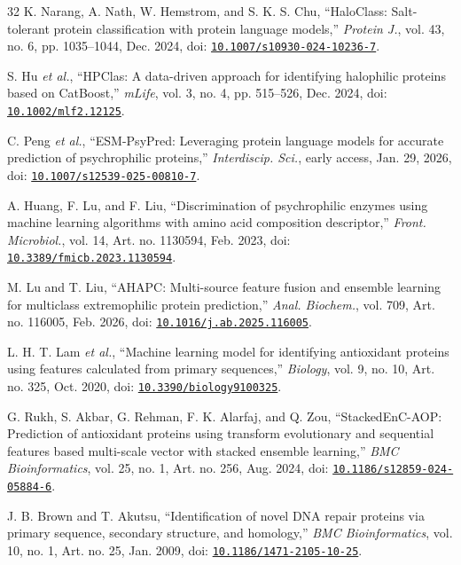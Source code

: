 \documentclass[conference]{IEEEtran}
\begin{document}
\begin{thebibliography}{32}
 K. Narang, A. Nath, W. Hemstrom, and S. K. S. Chu, ``HaloClass: Salt-tolerant protein classification with protein language models,'' \textit{Protein J.}, vol. 43, no. 6, pp. 1035--1044, Dec. 2024, doi: \href{https://doi.org/10.1007/s10930-024-10236-7}{\nolinkurl{10.1007/s10930-024-10236-7}}.

 S. Hu \textit{et al.}, ``HPClas: A data-driven approach for identifying halophilic proteins based on CatBoost,'' \textit{mLife}, vol. 3, no. 4, pp. 515--526, Dec. 2024, doi: \href{https://doi.org/10.1002/mlf2.12125}{\nolinkurl{10.1002/mlf2.12125}}.

 C. Peng \textit{et al.}, ``ESM-PsyPred: Leveraging protein language models for accurate prediction of psychrophilic proteins,'' \textit{Interdiscip. Sci.}, early access, Jan. 29, 2026, doi: \href{https://doi.org/10.1007/s12539-025-00810-7}{\nolinkurl{10.1007/s12539-025-00810-7}}.

 A. Huang, F. Lu, and F. Liu, ``Discrimination of psychrophilic enzymes using machine learning algorithms with amino acid composition descriptor,'' \textit{Front. Microbiol.}, vol. 14, Art. no. 1130594, Feb. 2023, doi: \href{https://doi.org/10.3389/fmicb.2023.1130594}{\nolinkurl{10.3389/fmicb.2023.1130594}}.

 M. Lu and T. Liu, ``AHAPC: Multi-source feature fusion and ensemble learning for multiclass extremophilic protein prediction,'' \textit{Anal. Biochem.}, vol. 709, Art. no. 116005, Feb. 2026, doi: \href{https://doi.org/10.1016/j.ab.2025.116005}{\nolinkurl{10.1016/j.ab.2025.116005}}.

 L. H. T. Lam \textit{et al.}, ``Machine learning model for identifying antioxidant proteins using features calculated from primary sequences,'' \textit{Biology}, vol. 9, no. 10, Art. no. 325, Oct. 2020, doi: \href{https://doi.org/10.3390/biology9100325}{\nolinkurl{10.3390/biology9100325}}.

 G. Rukh, S. Akbar, G. Rehman, F. K. Alarfaj, and Q. Zou, ``StackedEnC-AOP: Prediction of antioxidant proteins using transform evolutionary and sequential features based multi-scale vector with stacked ensemble learning,'' \textit{BMC Bioinformatics}, vol. 25, no. 1, Art. no. 256, Aug. 2024, doi: \href{https://doi.org/10.1186/s12859-024-05884-6}{\nolinkurl{10.1186/s12859-024-05884-6}}.

 J. B. Brown and T. Akutsu, ``Identification of novel DNA repair proteins via primary sequence, secondary structure, and homology,'' \textit{BMC Bioinformatics}, vol. 10, no. 1, Art. no. 25, Jan. 2009, doi: \href{https://doi.org/10.1186/1471-2105-10-25}{\nolinkurl{10.1186/1471-2105-10-25}}.


\end{thebibliography}
\end{document}
